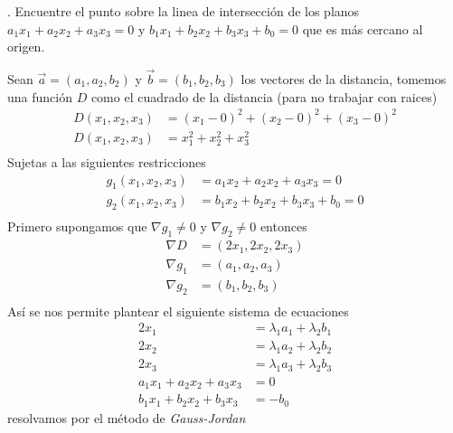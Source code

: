 \documentclass[letterpaper]{article}
\renewcommand{\l}{\lambda}
\renewcommand{\*}{\cdot}
\theoremstyle{definition}
\begin{document}
. Encuentre el punto sobre la linea de intersección de los planos  $a_1x_1 + a_2x_2 + a_3x_3 = 0$ y $b_1x_1 + b_2x_2 + b_3x_3 + b_0 = 0$ que es más cercano al origen.

Sean $ \vec{a}  = (a_1, a_2, b_2)$ y $ \vec{b} = (b_1, b_2, b_3) $ los vectores de la distancia, tomemos una función $ D $ como el cuadrado de la distancia (para no trabajar con raices) 
\begin{align*}
	D(x_1, x_2, x_3) &= (x_1 -0)^2 + (x_2 -0)^2 + (x_3 -0)^2\\
	D(x_1, x_2, x_3) &= x_1^2 + x_2^2 + x_3^2\\
\end{align*}
Sujetas a las siguientes restricciones 
\begin{align*}
	g_1(x_1, x_2, x_3) &= a_1 x_2 + a_2 x_2 + a_3 x_3 = 0\\
	g_2(x_1, x_2, x_3) &= b_1 x_2 + b_2 x_2 + b_3 x_3  + b_0 = 0\\
\end{align*}
Primero supongamos que $ \nabla g_1 \neq 0 $ y $ \nabla g_2 \neq 0 $ entonces
\begin{align*}
	\nabla D &= (2x_1, 2x_2, 2x_3)\\
	\nabla g_1 &= (a_1, a_2, a_3)\\
	\nabla g_2 &= (b_1, b_2, b_3)\\
\end{align*}
Así se nos permite plantear el siguiente sistema de ecuaciones
\setcounter{equation}{0}
\begin{align} 
	2x_1 &= \l_1 a_1 + \l_2 b_1\\
	2x_2 &= \l_1 a_2 + \l_2 b_2\\
	2x_3 &= \l_1 a_3 + \l_2 b_3\\
	a_1 x_1 + a_2 x_2 + a_3 x_3 &= 0\\
	b_1 x_1 + b_2 x_2 + b_3 x_3 &= -b_0
\end{align}
resolvamos por el método de \textit{Gauss-Jordan}
\end{document}
